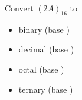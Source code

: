 
Convert $(2A)_{16}$ to 
\begin{itemize}
\item binary (base \underline{\phantom{~~~2~~}})

\vspace{25pt}

\item decimal (base \underline{\phantom{~~10~~}})

\vspace{25pt}

\item octal (base \underline{\phantom{~~~8~~}})

\vspace{25pt}

\item ternary (base \underline{\phantom{~~~3~~}})

\vspace{25pt}

\end{itemize}